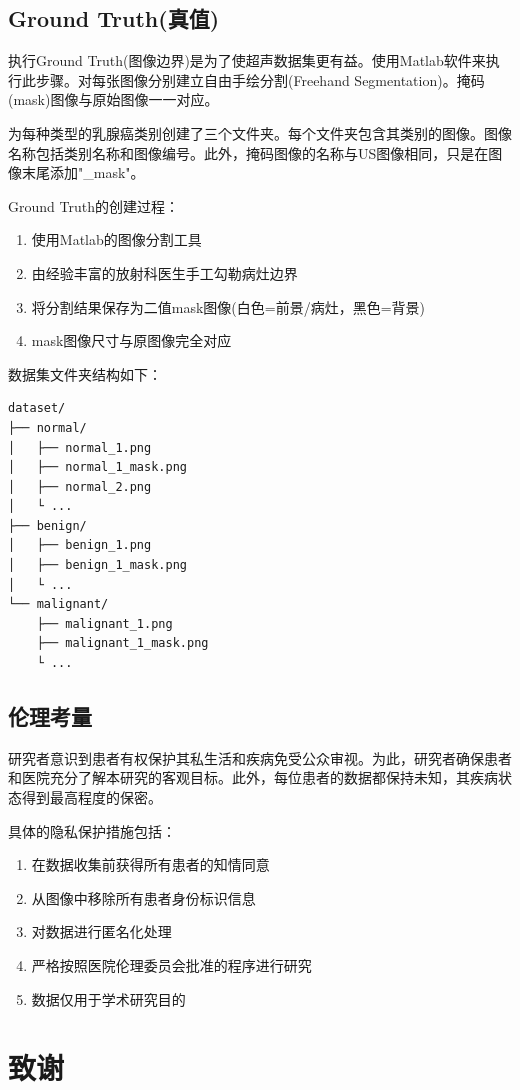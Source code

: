 \documentclass[supercite]{../Hust-undergraduate-translation/Experimental_Report}
\theoremstyle{definition}
\begin{document}
\subsection{Ground Truth(真值)}

执行Ground Truth(图像边界)是为了使超声数据集更有益。使用Matlab软件来执行此步骤。对每张图像分别建立自由手绘分割(Freehand Segmentation)。掩码(mask)图像与原始图像一一对应。

为每种类型的乳腺癌类别创建了三个文件夹。每个文件夹包含其类别的图像。图像名称包括类别名称和图像编号。此外，掩码图像的名称与US图像相同，只是在图像末尾添加"\_mask"。

Ground Truth的创建过程：
\begin{enumerate}
\item 使用Matlab的图像分割工具
\item 由经验丰富的放射科医生手工勾勒病灶边界
\item 将分割结果保存为二值mask图像(白色=前景/病灶，黑色=背景)
\item mask图像尺寸与原图像完全对应
\end{enumerate}

数据集文件夹结构如下：
\begin{verbatim}
dataset/
├── normal/
│   ├── normal_1.png
│   ├── normal_1_mask.png
│   ├── normal_2.png
│   └ ...
├── benign/
│   ├── benign_1.png
│   ├── benign_1_mask.png
│   └ ...
└── malignant/
    ├── malignant_1.png
    ├── malignant_1_mask.png
    └ ...
\end{verbatim}

\subsection{伦理考量}

研究者意识到患者有权保护其私生活和疾病免受公众审视。为此，研究者确保患者和医院充分了解本研究的客观目标。此外，每位患者的数据都保持未知，其疾病状态得到最高程度的保密。

具体的隐私保护措施包括：
\begin{enumerate}
\item 在数据收集前获得所有患者的知情同意
\item 从图像中移除所有患者身份标识信息
\item 对数据进行匿名化处理
\item 严格按照医院伦理委员会批准的程序进行研究
\item 数据仅用于学术研究目的
\end{enumerate}

\section{致谢}
\end{document}
